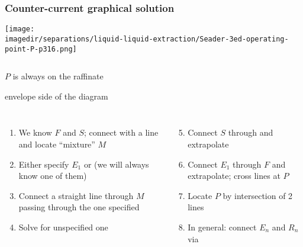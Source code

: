 \begin{frame}\frametitle{Counter-current graphical solution}
	\begin{center}
		\texttt{[image: \\imagedir/separations/liquid-liquid-extraction/Seader-3ed-operating-point-P-p316.png]}
	\end{center}
	\vspace{-4cm}
	\begin{columns}[t]
			\begin{exampleblock}{}
				\hfill {\small $P$ is always on the raffinate}

				\hfill {\small envelope side of the diagram}
			\end{exampleblock}
	\end{columns}	
	\vspace{2.5cm}
	\begin{columns}[t]
		\vspace{-18pt}
		{\scriptsize
			\begin{enumerate}
				\item	We know $F$ and $S$; connect with a line and locate ``mixture'' $M$
				\item	Either specify $E_1$ or {\color{myRed}{$R_N$}} (we will always know one of them)
				\item	Connect a straight line through $M$ passing through the one specified
				\item	Solve for unspecified one {\color{myOrange}{[via tie line]}}
			\end{enumerate}}
		\vspace{-18pt}
		{\scriptsize				
			\begin{enumerate}
				\setcounter{enumi}{4}
				\item	Connect $S$ through {\color{myRed}{$R_N$}} and extrapolate
				\item	Connect $E_1$ through $F$ and extrapolate; cross lines at $P$
				\item	Locate $P$ by intersection of 2 lines
				\item	In general: connect $E_n$ and $R_n$ via {\color{myOrange}{equilibrium tie lines}}
			\end{enumerate}}
	\end{columns}
\end{frame}

